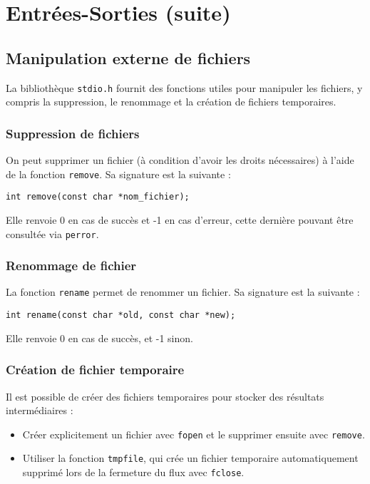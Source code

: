 \documentclass[french,11pt]{article}
\begin{document}
\section{Entrées-Sorties (suite)}

\subsection{Manipulation externe de fichiers}
La bibliothèque \texttt{stdio.h} fournit des fonctions utiles pour manipuler les fichiers, y compris la suppression, le renommage et la création de fichiers temporaires.

\subsubsection{Suppression de fichiers}
On peut supprimer un fichier (à condition d'avoir les droits nécessaires) à l'aide de la fonction \texttt{remove}. Sa signature est la suivante :
\begin{verbatim}
int remove(const char *nom_fichier);
\end{verbatim}
Elle renvoie 0 en cas de succès et -1 en cas d'erreur, cette dernière pouvant être consultée via \texttt{perror}.

\subsubsection{Renommage de fichier}
La fonction \texttt{rename} permet de renommer un fichier. Sa signature est la suivante :
\begin{verbatim}
int rename(const char *old, const char *new);
\end{verbatim}
Elle renvoie 0 en cas de succès, et -1 sinon.

\subsubsection{Création de fichier temporaire}
Il est possible de créer des fichiers temporaires pour stocker des résultats intermédiaires :
\begin{itemize}
    \item Créer explicitement un fichier avec \texttt{fopen} et le supprimer ensuite avec \texttt{remove}.
    \item Utiliser la fonction \texttt{tmpfile}, qui crée un fichier temporaire automatiquement supprimé lors de la fermeture du flux avec \texttt{fclose}.
\end{itemize}
\end{document}
